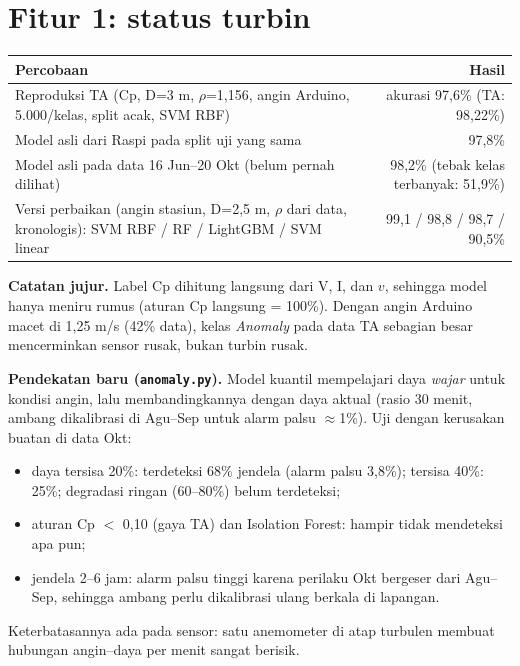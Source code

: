 \documentclass[10.5pt,a4paper]{article}
\newcommand{\cmd}[1]{\texttt{#1}}
\begin{document}
\section{Fitur 1: status turbin}
\begin{center}
\small
\begin{tabularx}{\linewidth}{@{}X r@{}}
\toprule
Percobaan & Hasil \\
\midrule
Reproduksi TA (Cp, D=3 m, $\rho$=1,156, angin Arduino, 5.000/kelas, split acak, SVM RBF) & akurasi 97,6\% (TA: 98,22\%) \\
Model asli dari Raspi pada split uji yang sama & 97,8\% \\
Model asli pada data 16 Jun--20 Okt (belum pernah dilihat) & 98,2\% (tebak kelas terbanyak: 51,9\%) \\
Versi perbaikan (angin stasiun, D=2,5 m, $\rho$ dari data, kronologis): SVM RBF / RF / LightGBM / SVM linear & 99,1 / 98,8 / 98,7 / 90,5\% \\
\bottomrule
\end{tabularx}
\end{center}
\textbf{Catatan jujur.} Label Cp dihitung langsung dari V, I, dan $v$, sehingga model hanya meniru rumus (aturan Cp langsung = 100\%).
Dengan angin Arduino macet di 1,25 m/s (42\% data), kelas \emph{Anomaly} pada data TA sebagian besar mencerminkan sensor rusak, bukan turbin rusak.

\textbf{Pendekatan baru (\cmd{anomaly.py}).} Model kuantil mempelajari daya \emph{wajar} untuk kondisi angin, lalu membandingkannya dengan daya aktual
(rasio 30 menit, ambang dikalibrasi di Agu--Sep untuk alarm palsu $\approx$1\%). Uji dengan kerusakan buatan di data Okt:
\begin{itemize}
  \item daya tersisa 20\%: terdeteksi 68\% jendela (alarm palsu 3,8\%); tersisa 40\%: 25\%; degradasi ringan (60--80\%) belum terdeteksi;
  \item aturan Cp $<$ 0,10 (gaya TA) dan Isolation Forest: hampir tidak mendeteksi apa pun;
  \item jendela 2--6 jam: alarm palsu tinggi karena perilaku Okt bergeser dari Agu--Sep, sehingga ambang perlu dikalibrasi ulang berkala di lapangan.
\end{itemize}
Keterbatasannya ada pada sensor: satu anemometer di atap turbulen membuat hubungan angin--daya per menit sangat berisik.
\end{document}
